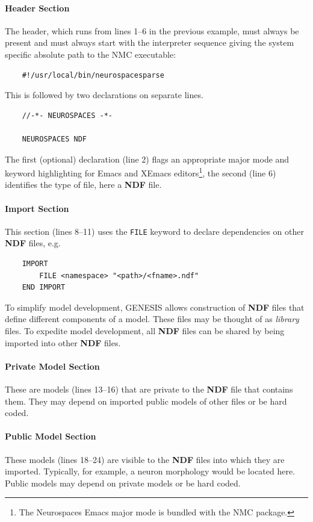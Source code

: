 \documentclass[12pt]{article}
\begin{document}
\paragraph*{Header Section}
The header, which runs from lines 1--6 in the previous example, must
always be present and must always start with the interpreter sequence
giving the system specific absolute path to the NMC executable:
\begin{verbatim}
    #!/usr/local/bin/neurospacesparse
\end{verbatim}
This is followed by two declarations on separate lines. 
\begin{verbatim}
    //-*- NEUROSPACES -*-
    
    NEUROSPACES NDF
    \end{verbatim}
The first (optional) declaration (line 2) flags an appropriate major
mode and keyword highlighting for Emacs and XEmacs
editors\footnote{The Neurospaces Emacs major mode is bundled with the
  NMC package.}, the second (line 6) identifies the type of file, here
a {\bf NDF} file.

\paragraph*{Import Section}
This section (lines 8--11) uses the {\tt FILE} keyword to declare
dependencies on other {\bf NDF} files, e.g.
\begin{verbatim}
    IMPORT
        FILE <namespace> "<path>/<fname>.ndf"
    END IMPORT
\end{verbatim}

To simplify model development, GENESIS allows construction of {\bf
  NDF} files that define different components of a model.  These files
may be thought of as \emph{library} files.  To expedite model
development, all {\bf NDF} files can be shared by being imported into
other {\bf NDF} files.

\paragraph*{Private Model Section}
These are models (lines 13--16) that are private to the {\bf NDF} file
that contains them.  They may depend on imported public models of
other files or be hard coded.

\paragraph*{Public Model Section}
These models (lines 18--24) are visible to the {\bf NDF} files into
which they are imported.  Typically, for example, a neuron morphology
would be located here.  Public models may depend on private models or
be hard coded.
\end{document}
